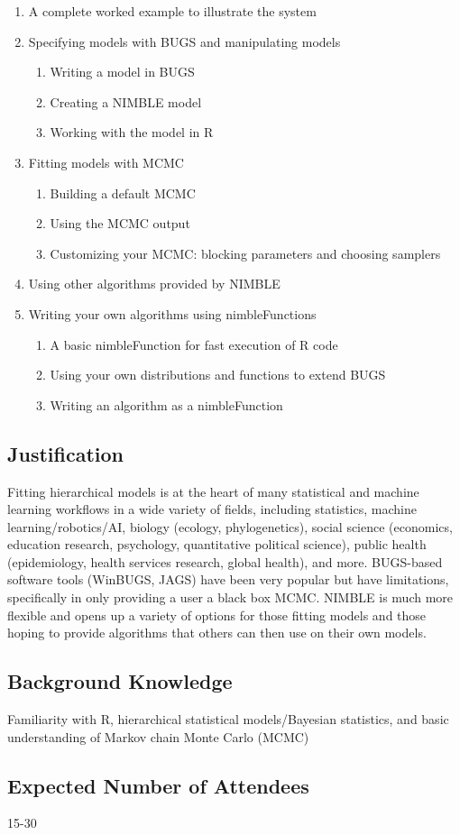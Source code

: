 \documentclass[]{article}
\begin{document}
\begin{enumerate}
\item A complete worked example to illustrate the system
\item Specifying models with BUGS and manipulating models
\begin{enumerate}
\item Writing a model in BUGS
\item Creating a NIMBLE model
\item Working with the model in R
\end{enumerate}
\item Fitting models with MCMC
\begin{enumerate}
\item Building a default MCMC
\item Using the MCMC output
\item Customizing your MCMC: blocking parameters and choosing samplers
\end{enumerate}
\item Using other algorithms provided by NIMBLE
\item Writing your own algorithms using nimbleFunctions
\begin{enumerate}
\item A basic nimbleFunction for fast execution of R code
\item Using your own distributions and functions to extend BUGS
\item Writing an algorithm as a nimbleFunction
\end{enumerate}
\end{enumerate}

\subsection{Justification}\label{justification}

Fitting hierarchical models is at the heart of many statistical and machine learning workflows in a wide variety of fields, including statistics, machine learning/robotics/AI, biology (ecology, phylogenetics), social science (economics, education research, psychology, quantitative political science), public health (epidemiology, health services research, global health), and more. BUGS-based software tools (WinBUGS, JAGS) have been very popular but have limitations, specifically in only providing a user a black box MCMC. NIMBLE is much more flexible and opens up a variety of options for those fitting models and those hoping to provide algorithms that others can then use on their own models. 


\subsection{Background Knowledge}\label{background-knowledge}

Familiarity with R, hierarchical statistical models/Bayesian statistics, and basic understanding of Markov chain Monte Carlo (MCMC)

\subsection{Expected Number of
Attendees}\label{expected-number-of-attendees}

15-30
\end{document}
